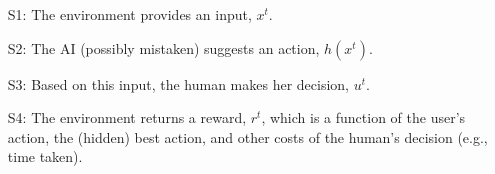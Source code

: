 \documentclass[letterpaper]{article} %
\newcommand{\bug}
    {\mbox{\rule{2mm}{2mm}}}
\newcommand{\Bug}[1]
    {\bug \footnote{BUG: {#1}}}
\newcommand{\?}{\mbox{?}}
\newcommand{\name}{AI-advised human decision making}
\begin{document}
\begin{itemize}[leftmargin=.25in]
\item[S1:] The environment provides an input, $x^t$. 
\item[S2:] The AI (possibly mistaken) suggests an action, $h(x^t)$. 
 \item[S3:] Based on this input, the human makes her decision, $u^t$.
\item[S4:] The environment returns a reward, $r^t$, which is a function of the user's action, the (hidden) best action, and other costs of the human's decision (e.g., time taken).
\end{itemize}
\end{document}
